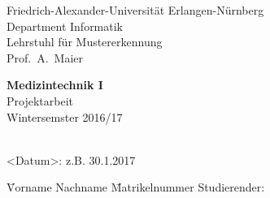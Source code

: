 

\begin{titlepage}

\begin{center}
Friedrich-Alexander-Universit\"at Erlangen-N\"urnberg\\
Department Informatik\\
Lehrstuhl f\"ur Mustererkennung\\
Prof.\ A.\ Maier\\

\vspace*{9em}

{\huge \textbf{\textsf{Medizintechnik I}}}\\[.3em]
{Projektarbeit}\\[.3em]
{Wintersemster 2016/17}\\

\vspace*{9em}

{\huge \textbf{\textsf{\titel}}}\\[.7em]
{<Datum>: z.B. 30.1.2017}
\end{center}

\vfill%
\begin{tabbing}
	\hspace*{5cm} \= Vorname Nachname \hspace*{4em} \= Matrikelnummer \kill
	Studierender:\> \erster \> \mnreins \\
\end{tabbing}

\end{titlepage}
